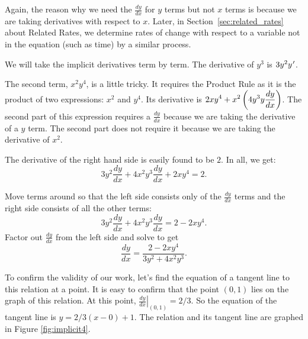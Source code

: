 Again, the reason why we need the $\frac{dy}{dx}$ for $y$ terms but not $x$ terms is because we are taking derivatives with respect to $x$.  Later, in Section~\ref{sec:related_rates} about Related Rates, we determine rates of change with respect to a variable not in the equation (such as time) by a similar process.\\


{We will take the implicit derivatives term by term. The derivative of $y^3$ is $3y^2y\hskip.75pt'$.  

The second term, $x^2y^4$, is a little tricky.  It requires the Product Rule as it is the product of two expressions: $x^2$ and $y^4$.  Its derivative is $\displaystyle 2xy^4 + x^2\left(4y^3y\frac{dy}{dx}\right)$.  The second part of this expression requires a $\frac{dy}{dx}$ because we are taking the derivative of a $y$ term.  The second part does not require it because we are taking the derivative of $x^2$.  

The derivative of the right hand side is easily found to be $2$. In all, we get:
$$3y^2\frac{dy}{dx} + 4x^2y^3\frac{dy}{dx} + 2xy^4 = 2.$$

Move terms around so that the left side consists only of the $\frac{dy}{dx}$ terms and the right side consists of all the other terms:
$$3y^2\frac{dy}{dx} + 4x^2y^3\frac{dy}{dx} = 2-2xy^4.$$
Factor out $\frac{dy}{dx}$ from the left side and solve to get
$$\frac{dy}{dx} = \frac{2-2xy^4}{3y^2+4x^2y^3}.$$

To confirm the validity of our work, let's find the equation of a tangent line to this relation at a point. It is easy to confirm that the point $(0,1)$ lies on the graph of this relation. At this point, $\left.\frac{dy}{dx}\right|_{(0,1)} = 2/3$. So the equation of the tangent line is $y = 2/3(x-0)+1$. The relation and its tangent line are graphed in Figure \ref{fig:implicit4}.


}\\

